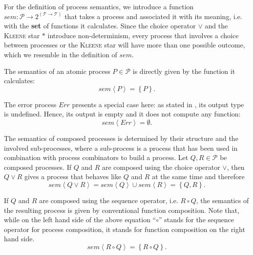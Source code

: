 For the definition of process semantics, we introduce a function $sem \colon \mathcal{P} \to 2^{\left( \mathcal{T} \to \mathcal{T} \right)}$ that takes a process and associated it with its meaning, i.e. with the \textbf{set} of functions it calculates. Since the choice operator $\vee$ and the \textsc{Kleene} star $*$ introduce non-determinism, every process that involves a choice between processes or the \textsc{Kleene} star will have more than one possible outcome, which we resemble in the definition of $sem$.

The semantics of an atomic process $P \in \mathcal{P}$ is directly given by the function it calculates:
\begin{equation}
  \label{eqn:sem_atomic}
  sem \left\langle P \right\rangle = \left\{ P \right\}.
\end{equation}

The error process $Err$ presents a special case here: as stated in , its output type is undefined. Hence, its output is empty and it does not compute any function:
\begin{equation}
  \label{eqn:sem_error}
  sem \left\langle Err \right\rangle = \emptyset.
\end{equation}

The semantics of composed processes is determined by their structure and the involved sub-processes, where a sub-process is a process that has been used in combination with process combinators to build a process. Let $Q, R \in \mathcal{P}$ be composed processes. If $Q$ and $R$ are composed using the choice operator $\vee$, then $Q \vee R$ gives a process that behaves like $Q$ and $R$ at the same time and therefore
\begin{equation}
  \label{eqn:sem_choice}
  sem \left\langle Q \vee R \right\rangle = sem \left\langle Q \right\rangle \cup sem \left\langle R \right\rangle = \left\{ Q, R \right\}.
\end{equation}

If $Q$ and $R$ are composed using the sequence operator, i.e. $R \circ Q$, the semantics of the resulting process is given by conventional function composition. Note that, while on the left hand side of the above equation \enquote{$\circ$} stands for the sequence operator for process composition, it stands for function composition on the right hand side.
\begin{equation}
  \label{eqn:sem_sequence}
  sem \left\langle R \circ Q \right\rangle = \left\{ R \circ Q \right\}.
\end{equation}

